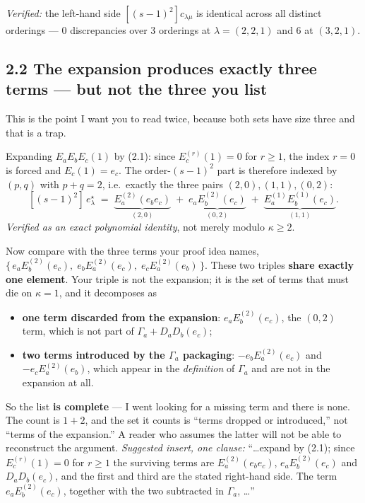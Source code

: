 \documentclass[11pt]{article}
\begin{document}
\emph{Verified:} the left-hand side $[(s-1)^2]c_{\lambda\mu}$ is identical across all distinct
orderings --- $0$ discrepancies over $3$ orderings at $\lambda=(2,2,1)$ and $6$ at $(3,2,1)$.

\subsection*{2.2 The expansion produces exactly three terms --- but not the three you list}

This is the point I want you to read twice, because both sets have size three and that is a trap.

Expanding $E_aE_bE_c(1)$ by (2.1): since $E_c^{(r)}(1)=0$ for $r\ge1$, the index $r=0$ is forced
and $E_c(1)=e_c$. The order-$(s-1)^2$ part is therefore indexed by $(p,q)$ with $p+q=2$, i.e.\
exactly the three pairs $(2,0),(1,1),(0,2)$:
\[
  [(s-1)^2]\,e^\star_\lambda \;=\;
  \underbrace{E_a^{(2)}(e_be_c)}_{(2,0)}
  \;+\;\underbrace{e_a E_b^{(2)}(e_c)}_{(0,2)}
  \;+\;\underbrace{E_a^{(1)}E_b^{(1)}(e_c)}_{(1,1)} .
\]
\emph{Verified as an exact polynomial identity}, not merely modulo $\kappa\ge2$.

Now compare with the three terms your proof idea names,
$\{\,e_aE_b^{(2)}(e_c),\;e_bE_a^{(2)}(e_c),\;e_cE_a^{(2)}(e_b)\,\}$.
These two triples \textbf{share exactly one element}. Your triple is not the expansion; it is the
set of terms that must die on $\kappa=1$, and it decomposes as
\begin{itemize}\itemsep0pt
  \item \textbf{one term discarded from the expansion}: $e_aE_b^{(2)}(e_c)$, the $(0,2)$ term,
        which is not part of $\Gamma_a+D_aD_b(e_c)$;
  \item \textbf{two terms introduced by the $\Gamma_a$ packaging}: $-e_bE_a^{(2)}(e_c)$ and
        $-e_cE_a^{(2)}(e_b)$, which appear in the \emph{definition} of $\Gamma_a$ and are not in
        the expansion at all.
\end{itemize}
So the list \textbf{is complete} --- I went looking for a missing term and there is none. The
count is $1+2$, and the set it counts is ``terms dropped or introduced,'' not ``terms of the
expansion.'' A reader who assumes the latter will not be able to reconstruct the argument.
\emph{Suggested insert, one clause:} ``\dots expand by (2.1); since $E_c^{(r)}(1)=0$ for $r\ge1$
the surviving terms are $E_a^{(2)}(e_be_c)$, $e_aE_b^{(2)}(e_c)$ and $D_aD_b(e_c)$, and the first
and third are the stated right-hand side. The term $e_aE_b^{(2)}(e_c)$, together with the two
subtracted in $\Gamma_a$, \dots''
\end{document}
